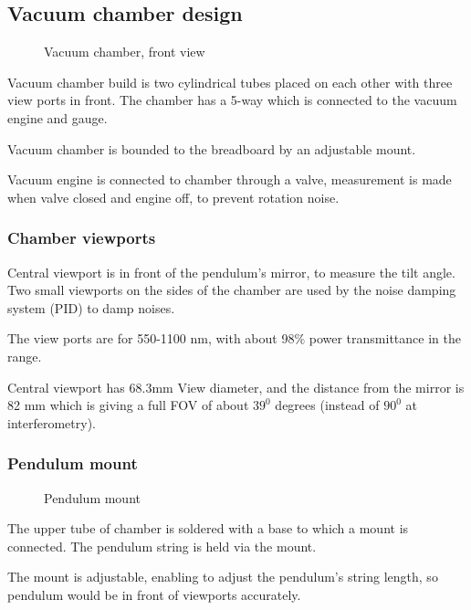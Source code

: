 \documentclass[\main/master.tex]{subfiles}
\begin{document}
\subsection{Vacuum chamber design}
\begin{figure}[htbp]
	\centering
	\caption[Vacuum chamber, front view]{Vacuum chamber, front view}
	\label{fig:chamber front}
\end{figure}
\FloatBarrier

\par\noindent
Vacuum chamber build is two cylindrical tubes placed on each other with three view ports in front. The chamber has a 5-way which is connected to the vacuum engine and gauge.
\par\noindent
Vacuum chamber is bounded to the breadboard by an adjustable mount.
\par\noindent
Vacuum engine is connected to chamber through a valve, measurement is made when valve closed and engine off, to prevent rotation noise.

\subsubsection{Chamber viewports}
\par\noindent
Central viewport is in front of the pendulum's mirror, to measure the tilt angle. Two small viewports on the sides of the chamber are used by the noise damping system (PID) to damp noises. 
\par\noindent
The view ports are for 550-1100 nm, with about 98$\%$ power transmittance in the range.
\par\noindent
Central viewport has 68.3mm View diameter, and the distance from the mirror is 82 mm which is giving a full FOV of about $39^0$ degrees (instead of $90^0$ at interferometry).

\subsubsection{Pendulum mount}
\begin{figure}[htbp]
	\centering
	\caption[Pendulum mount]{Pendulum mount}
	\label{fig:mount}
\end{figure}
\FloatBarrier
\par\noindent
The upper tube of chamber is soldered with a base to which a mount is connected. The pendulum string is held via the mount.
\par\noindent
The mount is adjustable, enabling to adjust the pendulum's string length, so pendulum would be in front of viewports accurately. 
\end{document}
